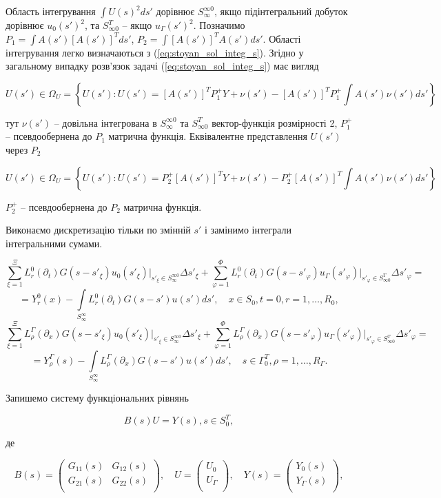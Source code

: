 Область інтегрування $\int U(s)^2ds'$  дорівнює $S_\infty^{\infty 0}$,
якщо підінтегральний добуток дорівнює $u_0(s')^2$, та $S_{\infty 0}^T$ – якщо $u_\Gamma(s')^2$.
Позначимо $P_1=\int A(s')[A(s')]^T ds'$, $P_2=\int [A(s')]^T A(s') ds'$.
Області інтегрування легко визначаються з (\ref{eq:stoyan_sol_integ_s}). Згідно
\cite{Stoyan-Obrachenie} у загальному випадку розв’язок задачі (\ref{eq:stoyan_sol_integ_s})
має вигляд

\[
U(s')\in\Omega_U = \left\{U(s'): U(s') = [A(s')]^T P_1^{+}Y + \nu(s') -
 [A(s')]^T P_1^{+}\int A(s')\nu(s')ds' \right\}
\]

тут $\nu(s')$ – довільна інтегрована в $S_\infty^{\infty 0}$ та $S_{\infty 0}^T$
вектор-функція розмірності 2, $P_1^+$ – псевдообернена
\cite{Stoyan-Modeliuvannia} до $P_1$ матрична функція.
Еквівалентне представлення $U(s')$ через $P_2$

\[
U(s')\in\Omega_U = \left\{U(s'): U(s') = P_2^{+} [A(s')]^T Y + \nu(s') -
  P_2^{+}[A(s')]^T\int A(s')\nu(s')ds' \right\}
\]

$P_2^+$ – псевдообернена до $P_2$ матрична функція.

Виконаємо дискретизацію тільки по змінній $s'$ і замінимо інтеграли інтегральними сумами.

\[
\sum_{\xi=1}^\Xi L_r^0(\partial_t)G(s-s'_\xi) u_0(s'_\xi)\bigg|_{s'_\xi\in S_{\infty}^{\infty 0}}\Delta s'_\xi +
\sum_{\varphi=1}^\Phi L_r^0(\partial_t)G(s-s'_\varphi) u_\Gamma(s'_\varphi)\bigg|_{s'_\varphi \in S_{\infty 0}^{T}}\Delta s'_\varphi =
\]
\[
=Y_r^0(x)-\int\limits_{S_\infty^\infty}L_r^0(\partial_t)G(s-s')u(s')ds',\quad x\in S_0, t=0, r=1,\ldots,R_0,
\]
\[
\sum_{\xi=1}^\Xi L_\rho^\Gamma(\partial_x)G(s-s'_\xi) u_0(s'_\xi)\bigg|_{s'_\xi\in S_{\infty}^{\infty 0}}\Delta s'_\xi +
\sum_{\varphi=1}^\Phi L_\rho^\Gamma(\partial_x)G(s-s'_\varphi) u_\Gamma(s'_\varphi)\bigg|_{s'_\varphi \in S_{\infty 0}^{T}}\Delta s'_\varphi =
\]
\[
=Y_\rho^\Gamma(s)-\int\limits_{S_\infty^\infty}L_\rho^\Gamma(\partial_x)G(s-s')u(s')ds',\quad s\in \Gamma_0^T, \rho=1,\ldots,R_\Gamma.
\]


Запишемо систему функціональних рівнянь

\begin{equation}
\label{eq:stoyan_sol_func_s_dash}
B(s)U=Y(s), s\in S_0^T,
\end{equation}

де

\[
B(s) =
\left(
\begin{array}{cc}
G_{11}(s) & G_{12}(s) \\
G_{21}(s) & G_{22}(s) \\
\end{array}
\right),
\quad
U=
\left(
\begin{array}{c}
U_{0}  \\
U_{\Gamma} \\
\end{array}
\right),
\quad
Y(s)=
\left(
\begin{array}{c}
Y_0(s) \\
Y_\Gamma(s) \\
\end{array}
\right),
\]

